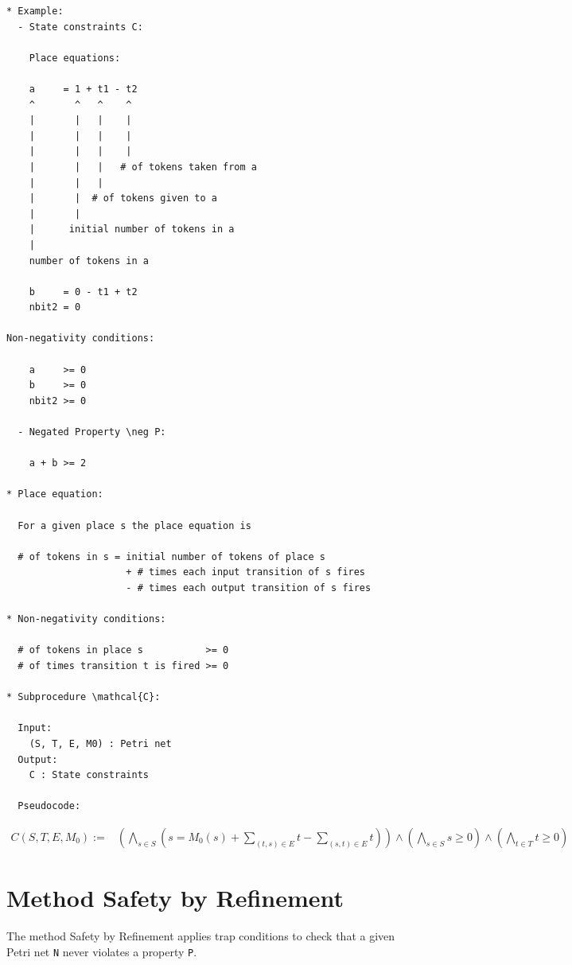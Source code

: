 \documentclass{llncs}
\begin{document}
\begin{verbatim}
* Example:
  - State constraints C:

    Place equations:
  
    a     = 1 + t1 - t2
    ^       ^   ^    ^
    |       |   |    |
    |       |   |    |
    |       |   |    |
    |       |   |   # of tokens taken from a
    |       |   |    
    |       |  # of tokens given to a
    |       |
    |      initial number of tokens in a
    |
    number of tokens in a

    b     = 0 - t1 + t2
    nbit2 = 0
    
Non-negativity conditions:
  
    a     >= 0
    b     >= 0
    nbit2 >= 0

  - Negated Property \neg P:

    a + b >= 2

* Place equation:
  
  For a given place s the place equation is

  # of tokens in s = initial number of tokens of place s
                     + # times each input transition of s fires
                     - # times each output transition of s fires

* Non-negativity conditions:

  # of tokens in place s           >= 0
  # of times transition t is fired >= 0

* Subprocedure \mathcal{C}:

  Input:
    (S, T, E, M0) : Petri net
  Output:
    C : State constraints

  Pseudocode:

  \end{verbatim}
\begin{align*}
  C(S, T, E, M_0) :=& \left( \bigwedge_{s \in S} \left(
    s = M_0(s) + \sum_{(t, s) \in E} t - \sum_{(s, t) \in E} t
  \right) \right) \land
    \left( \bigwedge_{s \in S} s \ge 0 \right) \land
    \left( \bigwedge_{t \in T} t \ge 0 \right)
\end{align*}

\newpage

\section{Method Safety by Refinement}

The method Safety by Refinement applies trap conditions to check that a given Petri net \verb=N= never violates a property \verb=P=.
\end{document}
